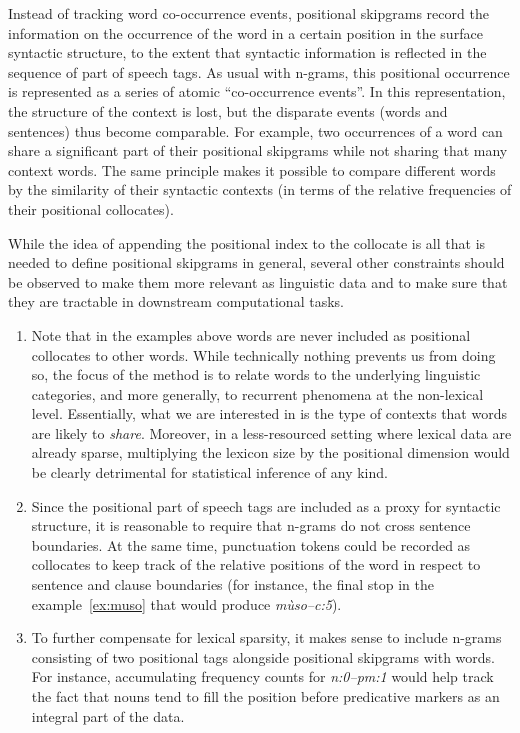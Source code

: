 \documentclass[12pt]{article}
\begin{document}
Instead of tracking word co-occurrence events, positional skipgrams
record the information on the occurrence of the word in a certain
position in the surface syntactic structure, to the extent that
syntactic information is reflected in the sequence of part of speech
tags. As usual with n-grams, this positional occurrence is represented
as a series of atomic “co-occurrence events”. In this representation,
the structure of the context is lost, but the disparate events (words
and sentences) thus become comparable. For example, two occurrences of
a word can share a significant part of their positional skipgrams
while not sharing that many context words. The same principle makes it
possible to compare different words by the similarity of their
syntactic contexts (in terms of the relative frequencies of their
positional collocates).



While the idea of appending the positional index to the collocate is all that
is needed to define positional skipgrams in general, several other
constraints should be observed to make them more relevant as
linguistic data and to make sure that they are tractable in
downstream computational tasks.

\begin{enumerate}
\item Note that in the examples above words are never included as
  positional collocates to other words. While technically nothing
  prevents us from doing so, the focus of the method is to relate
  words to the underlying linguistic categories, and more generally,
  to recurrent phenomena at the non-lexical level.  Essentially, what
  we are interested in is the type of contexts that words are likely
  to \textit{share}.  Moreover, in a less-resourced setting where
  lexical data are already sparse, multiplying the lexicon size by the
  positional dimension would be clearly detrimental for statistical
  inference of any kind.
\item Since the positional part of speech tags are included as a proxy
  for syntactic structure, it is reasonable to require that n-grams do
  not cross sentence boundaries.  At the same time, punctuation tokens
  could be recorded as collocates to keep track of the relative
  positions of the word in respect to sentence and clause boundaries
  (for instance, the final stop in the example~\ref{ex:muso} that would
  produce \textit{mùso--c:5}).
\item To further compensate for lexical sparsity, it makes sense to
  include n-grams consisting of two positional tags alongside
  positional skipgrams with words. For instance, accumulating
  frequency counts for \textit{n:0--pm:1} would help track the
  fact that nouns tend to fill the position before predicative
  markers as an integral part of the data.
\end{enumerate} 
\end{document}
